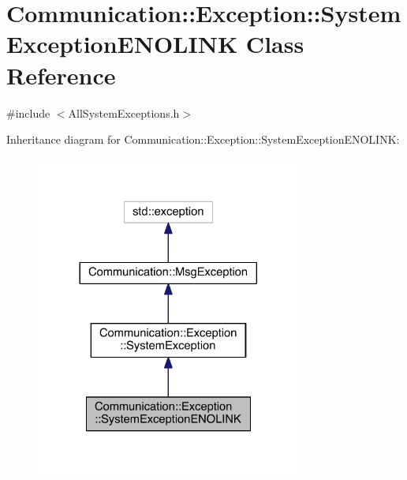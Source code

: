 \hypertarget{class_communication_1_1_exception_1_1_system_exception_e_n_o_l_i_n_k}{}\section{Communication\+:\+:Exception\+:\+:System\+Exception\+E\+N\+O\+L\+I\+N\+K Class Reference}
\label{class_communication_1_1_exception_1_1_system_exception_e_n_o_l_i_n_k}


{\ttfamily \#include $<$All\+System\+Exceptions.\+h$>$}



Inheritance diagram for Communication\+:\+:Exception\+:\+:System\+Exception\+E\+N\+O\+L\+I\+N\+K\+:\nopagebreak
\begin{figure}[H]
\begin{center}
\leavevmode
\includegraphics[width=248pt]{class_communication_1_1_exception_1_1_system_exception_e_n_o_l_i_n_k__inherit__graph}
\end{center}
\end{figure}


